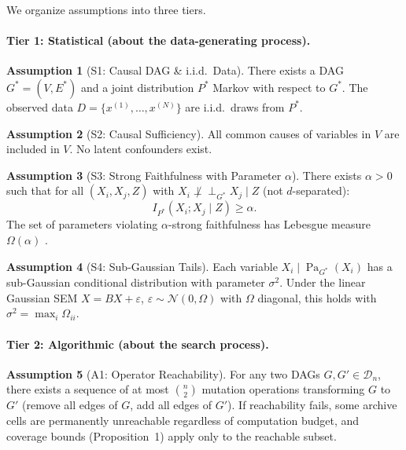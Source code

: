 \documentclass{article}
\theoremstyle{definition}
\newtheorem{assumption}{Assumption}
\theoremstyle{plain}
\theoremstyle{remark}
\DeclareMathOperator{\Pa}{Pa}
\newcommand{\indep}{\perp\!\!\!\perp}
\begin{document}
We organize assumptions into three tiers.

\paragraph{Tier 1: Statistical (about the data-generating process).}

\begin{assumption}[S1: Causal DAG \& i.i.d.\ Data]
\label{ass:S1}
There exists a DAG $G^* = (V, E^*)$ and a joint distribution $P^*$ Markov with
respect to $G^*$. The observed data $D = \{x^{(1)}, \ldots, x^{(N)}\}$ are
i.i.d.\ draws from $P^*$.
\end{assumption}

\begin{assumption}[S2: Causal Sufficiency]
\label{ass:S2}
All common causes of variables in $V$ are included in $V$. No latent confounders
exist.
\end{assumption}

\begin{assumption}[S3: Strong Faithfulness with Parameter $\alpha$]
\label{ass:S3}
There exists $\alpha > 0$ such that for all $(X_i, X_j, Z)$ with
$X_i \not\indep_{G^*} X_j \mid Z$ (not $d$-separated):
$$I_{P^*}(X_i; X_j \mid Z) \geq \alpha.$$
The set of parameters violating $\alpha$-strong faithfulness has Lebesgue measure
$\Omega(\alpha)$ \citep{uhler2013geometry}.
\end{assumption}

\begin{assumption}[S4: Sub-Gaussian Tails]
\label{ass:S4}
Each variable $X_i \mid \Pa_{G^*}(X_i)$ has a sub-Gaussian conditional
distribution with parameter $\sigma^2$. Under the linear Gaussian SEM
$X = BX + \varepsilon$, $\varepsilon \sim \mathcal{N}(0, \Omega)$ with $\Omega$
diagonal, this holds with $\sigma^2 = \max_i \Omega_{ii}$.
\end{assumption}

\paragraph{Tier 2: Algorithmic (about the search process).}

\begin{assumption}[A1: Operator Reachability]
\label{ass:A1}
For any two DAGs $G, G' \in \mathcal{D}_n$, there exists a sequence of at most
$\binom{n}{2}$ mutation operations transforming $G$ to $G'$ (remove all edges of
$G$, add all edges of $G'$).
If reachability fails, some archive cells are permanently unreachable regardless of computation budget, and coverage bounds (Proposition~1) apply only to the reachable subset.
\end{assumption}
\end{document}
